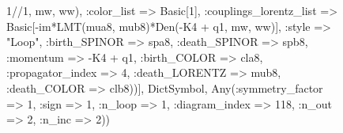 \documentclass{revtex4}
\begin{document}
\begin{figure}[!htb]
\begin{center}
{1//1, mw, ww), :color_list => Basic[1], :couplings_lorentz_list => Basic[-im*LMT(mua8, mub8)*Den(-K4 + q1, mw, ww)], :style => "Loop", :birth_SPINOR => spa8, :death_SPINOR => spb8, :momentum => -K4 + q1, :birth_COLOR => cla8, :propagator_index => 4, :death_LORENTZ => mub8, :death_COLOR => clb8))], Dict{Symbol, Any}(:symmetry_factor => 1, :sign => 1, :n_loop => 1, :diagram_index => 118, :n_out => 2, :n_inc => 2)) 
}
\end{center}
\end{figure}
\end{document}
